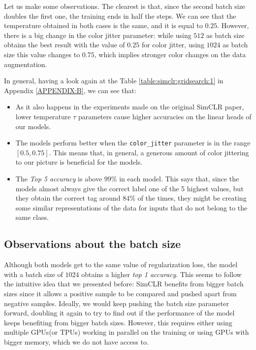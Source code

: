 Let us make some observations. The clearest is that, since the second batch size doubles the first one, the training ends in half the steps. We can see that the temperature obtained in both cases is the same, and it is equal to $0.25$. However, there is a big change in the color jitter parameter: while using $512$ as batch size obtains the best result with the value of $0.25$ for color jitter, using $1024$ as batch size this value changes to $0.75$, which implies stronger color changes on the data augmentation. 

In general, having a look again at the Table \ref{table:simclr:gridsearch:1} in Appendix \ref{APPENDIX:B},  we can see that:

\begin{itemize}
    \item As it also happens in the experiments made on the original SimCLR paper, lower temperature $\tau$ parameters cause higher accuracies on the linear heads of our models.
    
    \item The models perform better when the \lstinline{color_jitter} parameter is in the range $[0.5,0.75]$. This means that, in general, a generous amount of color jittering to our picture is beneficial for the models.

    \item The \emph{Top 5 accuracy} is above $99\%$ in each model. This says that, since the models almost always give the correct label one of the 5 highest values, but they obtain the correct tag around $84\%$ of the times, they might be creating some similar representations of the data for inputs that do not belong to the same class. 
\end{itemize}

\subsection*{Observations about the batch size}

Although both models get to the same value of regularization loss, the model with a batch size of $1024$ obtains a higher \emph{top 1 accuracy}. This seems to follow the intuitive idea that we presented before: SimCLR benefits from bigger batch sizes since it allows a positive sample to be compared and pushed apart from negative samples. Ideally, we would keep pushing the batch size parameter forward, doubling it again to try to find out if the performance of the model keeps benefiting from bigger batch sizes. However, this requires either using multiple GPUs(or TPUs) working in parallel on the training or using GPUs with bigger memory, which we do not have access to. 

